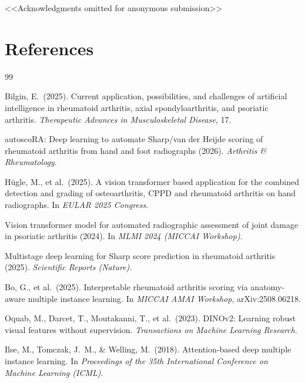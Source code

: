 \documentclass{article}
\begin{document}
\begin{ack}
\textless\textless Acknowledgments omitted for anonymous submission\textgreater\textgreater
\end{ack}

\section*{References}
{\small
\begin{thebibliography}{99}

  Bilgin, E.\ (2025).
  Current application, possibilities, and challenges of artificial intelligence in rheumatoid arthritis, axial spondyloarthritis, and psoriatic arthritis.
  {\it Therapeutic Advances in Musculoskeletal Disease}, 17.

  autoscoRA: Deep learning to automate Sharp/van der Heijde scoring of rheumatoid arthritis from hand and foot radiographs (2026).
  {\it Arthritis \& Rheumatology}.

  Hügle, M., et al.\ (2025).
  A vision transformer based application for the combined detection and grading of osteoarthritis, CPPD and rheumatoid arthritis on hand radiographs.
  In {\it EULAR 2025 Congress}.

  Vision transformer model for automated radiographic assessment of joint damage in psoriatic arthritis (2024).
  In {\it MLMI 2024 (MICCAI Workshop)}.

  Multistage deep learning for Sharp score prediction in rheumatoid arthritis (2025).
  {\it Scientific Reports (Nature)}.

  Bo, G., et al.\ (2025).
  Interpretable rheumatoid arthritis scoring via anatomy-aware multiple instance learning.
  In {\it MICCAI AMAI Workshop}, arXiv:2508.06218.

  Oquab, M., Darcet, T., Moutakanni, T., et al.\ (2023).
  DINOv2: Learning robust visual features without supervision.
  {\it Transactions on Machine Learning Research}.

  Ilse, M., Tomczak, J.\ M., \& Welling, M.\ (2018).
  Attention-based deep multiple instance learning.
  In {\it Proceedings of the 35th International Conference on Machine Learning (ICML)}.


\end{thebibliography}}
\end{document}
